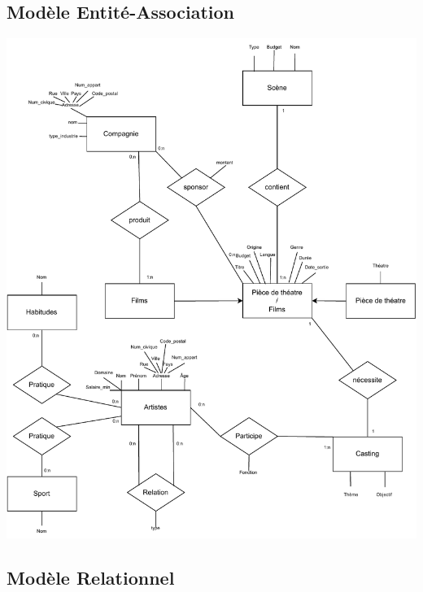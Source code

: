 \documentclass{article}
\begin{document}
\subsection{Modèle Entité-Association}
\begin{center}
\includegraphics[scale=0.9]{../modeleEA.pdf}
\end{center}
  
\newpage

\subsection{Modèle Relationnel}
\end{document}
